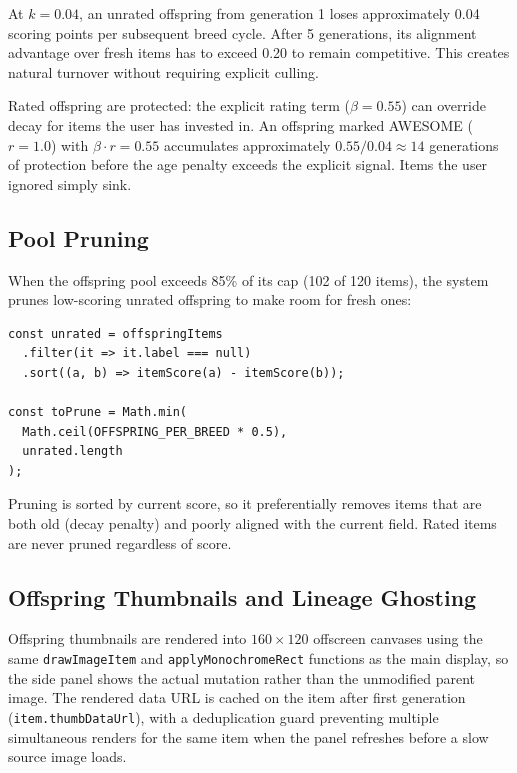 \documentclass[12pt, a4paper]{article}
\begin{document}
At $k = 0.04$, an unrated offspring from generation 1 loses approximately 0.04 scoring points per subsequent breed cycle. After 5 generations, its alignment advantage over fresh items has to exceed 0.20 to remain competitive. This creates natural turnover without requiring explicit culling.

Rated offspring are protected: the explicit rating term ($\beta = 0.55$) can override decay for items the user has invested in. An offspring marked AWESOME ($r = 1.0$) with $\beta \cdot r = 0.55$ accumulates approximately $0.55 / 0.04 \approx 14$ generations of protection before the age penalty exceeds the explicit signal. Items the user ignored simply sink.

\subsection{Pool Pruning}

When the offspring pool exceeds 85\% of its cap (102 of 120 items), the system prunes low-scoring unrated offspring to make room for fresh ones:

\begin{lstlisting}[language={}, caption={Probabilistic pruning on breed}]
const unrated = offspringItems
  .filter(it => it.label === null)
  .sort((a, b) => itemScore(a) - itemScore(b));

const toPrune = Math.min(
  Math.ceil(OFFSPRING_PER_BREED * 0.5),
  unrated.length
);
\end{lstlisting}

Pruning is sorted by current score, so it preferentially removes items that are both old (decay penalty) and poorly aligned with the current field. Rated items are never pruned regardless of score.

\subsection{Offspring Thumbnails and Lineage Ghosting}

Offspring thumbnails are rendered into $160 \times 120$ offscreen canvases using the same \texttt{drawImageItem} and \texttt{applyMonochromeRect} functions as the main display, so the side panel shows the actual mutation rather than the unmodified parent image. The rendered data URL is cached on the item after first generation (\texttt{item.thumbDataUrl}), with a deduplication guard preventing multiple simultaneous renders for the same item when the panel refreshes before a slow source image loads.
\end{document}
